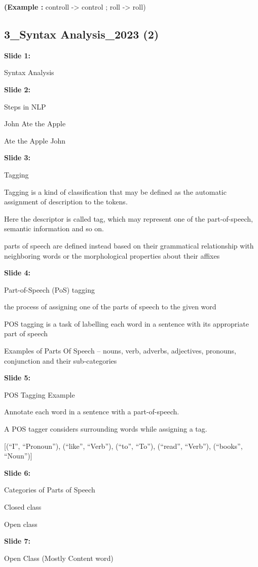 \documentclass[11pt,a4paper]{article}
\begin{document}
\textbf{(Example :}  controll -> control ; roll -> roll)


\subsection{3_Syntax Analysis_2023 (2)}

\textbf{Slide 1:}

Syntax Analysis

\textbf{Slide 2:}

Steps in NLP

John Ate the Apple

Ate  the Apple John

\textbf{Slide 3:}

Tagging

Tagging is a kind of classification that may be defined as the automatic assignment of description to the tokens.

Here the descriptor is called tag, which may represent one of the part-of-speech, semantic information and so on.

parts of speech are defined instead based on their grammatical relationship with neighboring words or the morphological properties about their affixes

\textbf{Slide 4:}

Part-of-Speech (PoS) tagging

the process of assigning one of the parts of speech to the given word

POS tagging is a task of labelling each word in a sentence with its appropriate part of speech

Examples of Parts Of Speech – nouns, verb, adverbs, adjectives, pronouns, conjunction and their sub-categories

\textbf{Slide 5:}

POS Tagging Example

Annotate each word in a sentence with a part-of-speech.

A POS tagger considers surrounding words while assigning a tag.

[(“I”, “Pronoun”), (“like”, “Verb”), (“to”, “To”), (“read”, “Verb”), (“books”, “Noun”)]

\textbf{Slide 6:}

Categories of Parts of Speech

Closed class

Open class

\textbf{Slide 7:}

Open Class (Mostly Content word)
\end{document}
